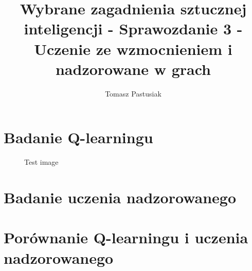 \documentclass{article}
\title{Wybrane zagadnienia sztucznej inteligencji - Sprawozdanie 3 - Uczenie ze wzmocnieniem i nadzorowane w grach}
\author{Tomasz Pastusiak \And{Leszek Kawecki}}
\begin{document}

\maketitle


\section{Badanie Q-learningu}

\begin{figure}[H]
  \centering
  \caption{Test image}
  \label{fig:ackley_10_100}
\end{figure}

\section{Badanie uczenia nadzorowanego}


\section{Porównanie Q-learningu i uczenia nadzorowanego}
\end{document}

